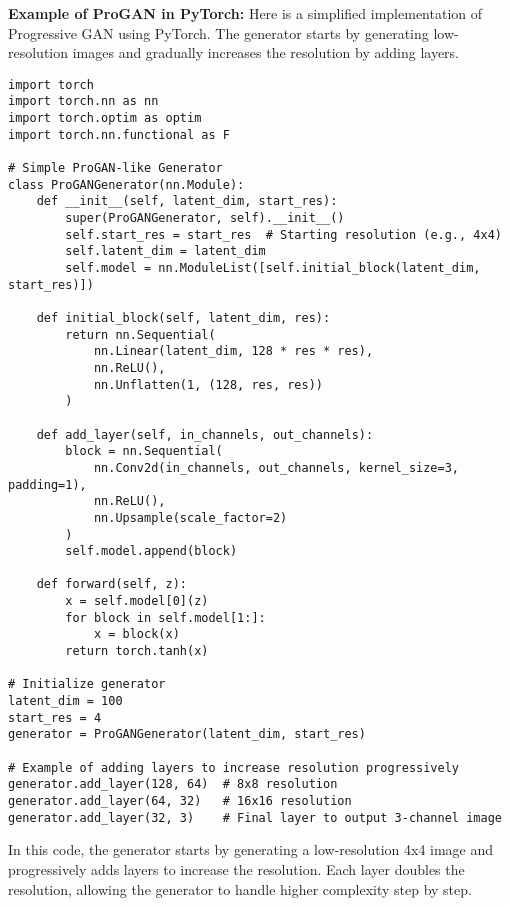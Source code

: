 \textbf{Example of ProGAN in PyTorch:}
Here is a simplified implementation of Progressive GAN using PyTorch. The generator starts by generating low-resolution images and gradually increases the resolution by adding layers.

\begin{lstlisting}[style=python]
import torch
import torch.nn as nn
import torch.optim as optim
import torch.nn.functional as F

# Simple ProGAN-like Generator
class ProGANGenerator(nn.Module):
    def __init__(self, latent_dim, start_res):
        super(ProGANGenerator, self).__init__()
        self.start_res = start_res  # Starting resolution (e.g., 4x4)
        self.latent_dim = latent_dim
        self.model = nn.ModuleList([self.initial_block(latent_dim, start_res)])

    def initial_block(self, latent_dim, res):
        return nn.Sequential(
            nn.Linear(latent_dim, 128 * res * res),
            nn.ReLU(),
            nn.Unflatten(1, (128, res, res))
        )

    def add_layer(self, in_channels, out_channels):
        block = nn.Sequential(
            nn.Conv2d(in_channels, out_channels, kernel_size=3, padding=1),
            nn.ReLU(),
            nn.Upsample(scale_factor=2)
        )
        self.model.append(block)

    def forward(self, z):
        x = self.model[0](z)
        for block in self.model[1:]:
            x = block(x)
        return torch.tanh(x)

# Initialize generator
latent_dim = 100
start_res = 4
generator = ProGANGenerator(latent_dim, start_res)

# Example of adding layers to increase resolution progressively
generator.add_layer(128, 64)  # 8x8 resolution
generator.add_layer(64, 32)   # 16x16 resolution
generator.add_layer(32, 3)    # Final layer to output 3-channel image
\end{lstlisting}

In this code, the generator starts by generating a low-resolution 4x4 image and progressively adds layers to increase the resolution. Each layer doubles the resolution, allowing the generator to handle higher complexity step by step.

